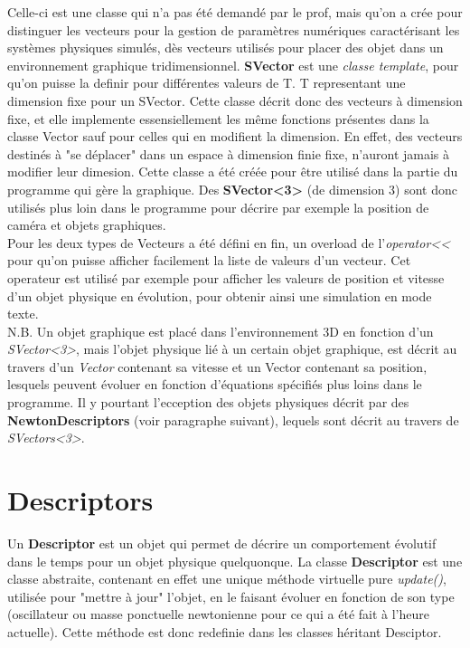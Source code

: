 \documentclass{report}
\begin{document}
Celle-ci est une classe qui n'a pas été demandé par le prof, mais qu'on a crée pour distinguer les vecteurs pour la gestion de paramètres numériques caractérisant
les systèmes physiques simulés, dès vecteurs utilisés pour placer des objet dans un environnement graphique tridimensionnel.
\textbf{SVector} est une \textit{classe template}, pour qu'on puisse la definir pour différentes valeurs de T. T representant une dimension fixe pour un SVector.
Cette classe décrit donc des vecteurs à dimension fixe, et elle implemente essensiellement les même fonctions présentes dans la classe Vector sauf pour celles qui en modifient la dimension.
En effet, des vecteurs destinés à "se déplacer" dans un espace à dimension finie fixe, n'auront jamais à modifier leur dimesion.
Cette classe a été créée pour être utilisé dans la partie du programme qui gère la graphique. 
Des \textbf{SVector<3>} (de dimension 3) sont donc utilisés plus loin dans le programme pour décrire par exemple la position de caméra et objets graphiques.
\\
Pour les deux types de Vecteurs a été défini en fin, un overload de l'\textit{operator<<} pour qu'on puisse afficher facilement la liste de valeurs d'un vecteur.
Cet operateur est utilisé par exemple pour afficher les valeurs de position et vitesse d'un objet physique en évolution, pour obtenir ainsi une simulation en mode texte.
\\
N.B. Un objet graphique est placé dans l'environnement 3D en fonction d'un \textit{SVector<3>}, mais l'objet physique lié à un certain objet graphique,
est décrit au travers d'un \textit{Vector} contenant sa vitesse et un Vector contenant sa position, lesquels peuvent évoluer en fonction d'équations spécifiés plus loins dans le programme.
Il y pourtant l'ecception des objets physiques décrit par des \textbf{NewtonDescriptors} (voir paragraphe suivant), lequels sont décrit au travers de \textit{SVectors<3>}.

\section{Descriptors}

Un \textbf{Descriptor} est un objet qui permet de décrire un comportement évolutif dans le temps pour un objet physique quelquonque.
La classe \textbf{Descriptor} est une classe abstraite, contenant en effet une unique méthode virtuelle pure \textit{update()}, utilisée pour "mettre à jour" l'objet,
en le faisant évoluer en fonction de son type (oscillateur ou masse ponctuelle newtonienne pour ce qui a été fait à l'heure actuelle).
Cette méthode est donc redefinie dans les classes héritant Desciptor.
\end{document}
